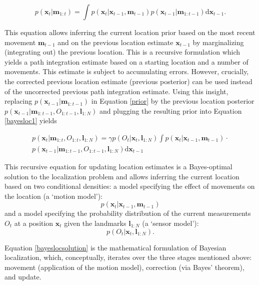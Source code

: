 \begin{equation}
\label{prior}
p(\bm x_{t} | \bm m_{1:t}) = \int p(\bm x_{t} | \bm x_{t-1}, \bm m_{t-1}) p(\bm x_{t-1} | \bm m_{1:t-1}) \mathrm{d} \bm x_{t-1}.
\end{equation}

This equation allows inferring the current location prior based on the most recent movement $\bm m_{t-1}$ and on the previous location estimate $\bm x_{t-1}$ by marginalizing (integrating out) the previous location. This is a recursive formulation which yields a path integration estimate based on a starting location and a number of movements. This estimate is subject to accumulating errors. However, crucially, the corrected previous location estimate (previous posterior) can be used instead of the uncorrected previous path integration estimate. Using this insight, replacing $p(\bm x_{t-1} | \bm m_{1:t-1})$ in Equation \ref{prior} by the previous location posterior $p(\bm x_{t-1} | \bm m_{1:t-1}, O_{1:t-1}, \bm l_{1:N})$ and plugging the resulting prior into Equation \ref{bayesloc1} yields

\begin{equation}
\label{bayeslocsolution}
\begin{split}
p(\bm x_{t} | \bm m_{1:t}, O_{1:t}, \bm l_{1:N}) = \gamma p(O_{t} | \bm x_{t}, \bm l_{1:N}) \int p(\bm x_{t} | \bm x_{t-1}, \bm m_{t-1}) \cdot \\
 p(\bm x_{t-1} | \bm m_{1:t-1}, O_{1:t-1}, \bm l_{1:N}) \mathrm{d} \bm x_{t-1}
\end{split}
\end{equation}

This recursive equation for updating location estimates is a Bayes-optimal solution to the localization problem and allows inferring the current location based on two conditional densities: a model specifying the effect of movements on the location (a `motion model'):
\begin{equation}\label{motionmodelq}
p(\bm x_{t} | \bm x_{t-1}, \bm m_{t-1})
\end{equation}
and a model specifying the probability distribution of the current measurements $ O_{t} $ at a position $ \bm x_{t} $ given the landmarks $ \bm l_{1:N} $ (a `sensor model'):
\begin{equation}\label{sensormodelq}
p(O_{t} | \bm x_{t}, \bm l_{1:N}).
\end{equation}

Equation \ref{bayeslocsolution} is the mathematical formulation of Bayesian localization, which, conceptually, iterates over the three stages mentioned above: movement (application of the motion model), correction (via Bayes' theorem), and update.

